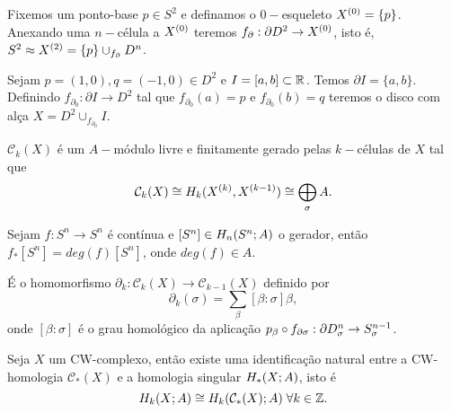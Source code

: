 \documentclass{beamer}
\begin{document}
	
	\begin{frame}
		\begin{exemplo}[2-esfera]
			Fixemos um ponto-base $p \in S^{2}$ e definamos o $0-$esqueleto $X^{(0)}=\{p\}$. Anexando uma $n-$célula a $X^{(0)}$ teremos $f_{\partial}: \partial D^{2} \to X^{(0)}$, isto é, $S^{2} \approx X^{(2)} = \{p\}\cup_{f_{\partial}} D^{n}_{}$.
		\end{exemplo}
		
		\pause
		\begin{exemplo}
			Sejam $p=(1,0), q=(-1,0) \in D^{2}$ e $I=[a,b] \subset \mathbb{R}^{}$. Temos $\partial I=\{a,b\}$. Definindo $f_{\partial_{0}}: \partial I \to D^{2}$ tal que $f_{\partial_{0}}(a)=p$ e $f_{\partial_{0}}(b)=q$ teremos o disco com alça $X=D^{2}\cup_{f_{\partial_{0}}}I$.   
		\end{exemplo}
	\end{frame}
	
	\begin{frame}
		
		\begin{lema}
			$\mathcal{C}_{k}(X)$ é um $A-$módulo livre e finitamente gerado pelas $k-$células de $X$ tal que 
			$$
			\mathcal{C}_{k}(X) \cong 
			H_{k}(X^{(k)}, X^{(k-1)}) \cong \bigoplus \limits_{\sigma} A.
			$$
		\end{lema}
		
		\begin{definicao}
			Sejam $f: S^{n} \to S^{n}$ é contínua e $[S^{n}] \in H_{n}(S^{n};A)$ o gerador, então $f_{*}[S^{n}] = deg(f)[S^{n}]$, onde $deg(f) \in A$.
		\end{definicao}
		
		\pause
		\begin{teorema}[CW-bordo]
			É o homomorfismo $\partial_{k}:\mathcal{C}_{k}(X)\to \mathcal{C}_{k-1}(X)$ definido por
			$$
			\partial_{k}(\sigma) = \sum_{\beta}[\beta:\sigma]\beta,
			$$
			onde $[\beta:\sigma]$ é o grau homológico da aplicação $p_{\beta} \circ f_{\partial\sigma}:\partial D^{n}_{\sigma} \to S^{n-1}_{\sigma}$.
		\end{teorema}
		
	\end{frame}

	\begin{frame}
		\begin{teorema}[CW-homologia]
			Seja $X$ um CW-complexo, então existe uma identificação natural entre a CW-homologia $\mathcal{C}_{*}(X)$ e a homologia singular $H_{*}(X;A)$, isto é 
			$$
			H_{k}(X;A) \cong H_{k}(\mathcal{C}_{*}(X);A)\; \forall k \in \mathbb{Z}.
			$$
		\end{teorema}
		
	\end{frame}
\end{document}
